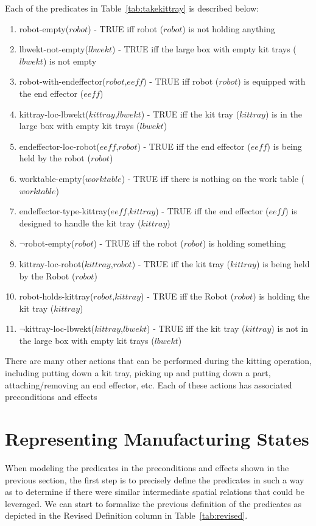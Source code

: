 \documentclass[final,1p,times]{elsarticle}
\newcommand{\const}[1] {$\mathit{#1}$}
\newcommand{\stvar}[1] {\textsf{#1}}
\begin{document}
Each of the predicates in Table~\ref{tab:takekittray} is described below:
\begin{enumerate}
\item \stvar{robot-empty}(\const{robot}) - TRUE iff robot (\const{robot}) is not holding anything
\item \stvar{lbwekt-not-empty}(\const{lbwekt}) - TRUE iff the large box with empty kit trays (\const{lbwekt}) is not empty
\item \stvar{robot-with-endeffector}(\const{robot},\const{eeff}) - TRUE iff robot (\const{robot}) is equipped with the end effector (\const{eeff})
\item \stvar{kittray-loc-lbwekt}(\const{kittray},\const{lbwekt}) - TRUE iff the kit tray (\const{kittray}) is in the large box with empty kit trays (\const{lbwekt})
\item \stvar{endeffector-loc-robot}(\const{eeff},\const{robot}) - TRUE iff the end effector (\const{eeff}) is being held by the robot (\const{robot})
\item \stvar{worktable-empty}(\const{worktable}) - TRUE iff there is nothing on the work table (\const{worktable})
\item \stvar{endeffector-type-kittray}(\const{eeff},\const{kittray}) - TRUE iff the end effector (\const{eeff}) is designed to handle the kit tray (\const{kittray})
\item $\neg$\stvar{robot-empty}(\const{robot}) - TRUE iff the robot (\const{robot}) is holding something
\item \stvar{kittray-loc-robot}(\const{kittray},\const{robot}) - TRUE iff the kit tray (\const{kittray}) is being held by the Robot (\const{robot})
\item \stvar{robot-holds-kittray}(\const{robot},\const{kittray}) - TRUE iff the Robot (\const{robot}) is holding the kit tray (\const{kittray})
\item $\neg$\stvar{kittray-loc-lbwekt}(\const{kittray},\const{lbwekt}) - TRUE iff the kit tray (\const{kittray}) is not in the large box with empty kit trays (\const{lbwekt})
\end{enumerate}

There are many other actions that can be performed during the kitting operation, including putting down a kit tray, picking up and putting down a part, attaching/removing an end effector, etc. Each of these actions has associated preconditions and effects

\section{Representing Manufacturing States}\label{S:section4}
When modeling the predicates in the preconditions and effects shown in the previous section, the first step is to precisely define the predicates in such a way as to determine if there were similar intermediate spatial relations that could be leveraged. We can start to formalize the previous definition of the predicates as depicted in the Revised Definition column in Table~\ref{tab:revised}.
\end{document}
